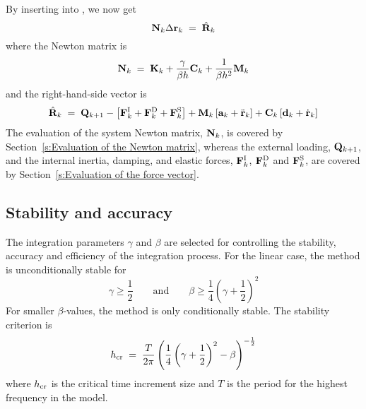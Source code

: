 By inserting  into , we now get
%
\begin{equation}
{\bf N}_k \Delta{\bf r}_k \;=\; \hat{\bf R}_k
\label{eq:326}
\end{equation}
%
where the Newton matrix is
%
\begin{equation}
{\bf N}_k \;=\; {\bf K}_k +
\frac{\gamma}{\beta h}{\bf C}_k +
\frac{1}{\beta h^2}{\bf M}_k
\label{eq:327}
\end{equation}
%
and the right-hand-side vector is
%
\begin{equation}
\hat{\mf R}_k \;=\; \Q_\kp1 - \left[
\Fi_k + \Fd_k + \Fs_k \right] +
{\mf M}_k \left[ {\mf a}_k + \ddot{\mf r}_k \right] +
{\mf C}_k \left[ {\mf d}_k + \dot{\mf r}_k \right]
\label{eq:328}
\end{equation}
%
The evaluation of the system Newton matrix, ${\bf N}_k$, is covered by
Section~\ref{s:Evaluation of the Newton matrix}, whereas the external loading,
$\Q_\kp1$, and the internal inertia, damping, and elastic forces, ${\bf F}^{\rm I}_k$,
${\bf F}^{\rm D}_k$ and ${\bf F}^{\rm S}_k$, are covered by
Section~\ref{s:Evaluation of the force vector}.

\subsection{Stability and accuracy}
\label{subs:Stability and accuracy}

The integration parameters $\gamma$ and $\beta$ are selected for controlling
the stability, accuracy and efficiency of the integration process.
For the linear case, the method is unconditionally stable for
%
\begin{equation}
\gamma \geq \frac{1}{2}
\qquad\text{and}\qquad
\beta \geq \frac{1}{4} \left( \gamma + \frac{1}{2} \right)^2
\label{eq:335}
\end{equation}
%
For smaller $\beta$-values, the method is only conditionally stable.
The stability criterion is
%
\begin{equation}
h_{\rm cr} \;=\; \frac{T}{2\pi} \left( \frac{1}{4}
\left( \gamma + \frac{1}{2} \right)^2 - \beta \right)^{-\frac{1}{2}}
\label{eq:336}
\end{equation}
%
where $h_{\rm cr}$ is the critical time increment size and $T$ is the period for
the highest frequency in the model.

